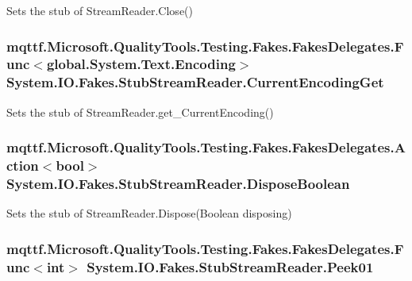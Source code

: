 Sets the stub of Stream\-Reader.\-Close()

\hypertarget{class_system_1_1_i_o_1_1_fakes_1_1_stub_stream_reader_a2a996c694b0d9b1f08158412380b38ab}{
\subsubsection[{Current\-Encoding\-Get}]{\setlength{\rightskip}{0pt plus 5cm}mqttf.\-Microsoft.\-Quality\-Tools.\-Testing.\-Fakes.\-Fakes\-Delegates.\-Func$<$global.\-System.\-Text.\-Encoding$>$ System.\-I\-O.\-Fakes.\-Stub\-Stream\-Reader.\-Current\-Encoding\-Get}}\label{class_system_1_1_i_o_1_1_fakes_1_1_stub_stream_reader_a2a996c694b0d9b1f08158412380b38ab}


Sets the stub of Stream\-Reader.\-get\-\_\-\-Current\-Encoding()

\hypertarget{class_system_1_1_i_o_1_1_fakes_1_1_stub_stream_reader_a53f0c6004ffff24f14752a645bf1139e}{
\subsubsection[{Dispose\-Boolean}]{\setlength{\rightskip}{0pt plus 5cm}mqttf.\-Microsoft.\-Quality\-Tools.\-Testing.\-Fakes.\-Fakes\-Delegates.\-Action$<$bool$>$ System.\-I\-O.\-Fakes.\-Stub\-Stream\-Reader.\-Dispose\-Boolean}}\label{class_system_1_1_i_o_1_1_fakes_1_1_stub_stream_reader_a53f0c6004ffff24f14752a645bf1139e}


Sets the stub of Stream\-Reader.\-Dispose(\-Boolean disposing)

\hypertarget{class_system_1_1_i_o_1_1_fakes_1_1_stub_stream_reader_adf925267875bdd2a5709248fb990150e}{
\subsubsection[{Peek01}]{\setlength{\rightskip}{0pt plus 5cm}mqttf.\-Microsoft.\-Quality\-Tools.\-Testing.\-Fakes.\-Fakes\-Delegates.\-Func$<$int$>$ System.\-I\-O.\-Fakes.\-Stub\-Stream\-Reader.\-Peek01}}\label{class_system_1_1_i_o_1_1_fakes_1_1_stub_stream_reader_adf925267875bdd2a5709248fb990150e}


